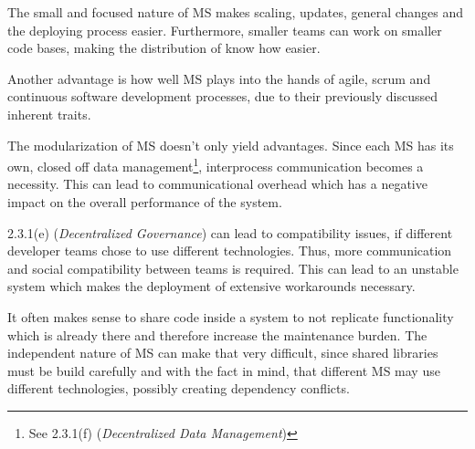 The small and focused nature of MS makes scaling, updates, general changes and the deploying process easier. Furthermore, smaller teams can work on smaller code bases, making the distribution of know how easier\cite{Riggins15}.

Another advantage is how well MS plays into the hands of agile, scrum and continuous software development processes, due to their previously discussed inherent traits.

The modularization of MS doesn't only yield advantages. Since each MS has its own, closed off data management\footnote{See 2.3.1(f) (\emph{Decentralized Data Management})}, interprocess communication becomes a necessity. This can lead to communicational overhead which has a negative impact on the overall performance of the system\cite{Wolff16}.

2.3.1(e) (\emph{Decentralized Governance}) can lead to compatibility issues, if different developer teams chose to use different technologies. Thus, more communication and social compatibility between teams is required. This can lead to an unstable system which makes the deployment of extensive workarounds necessary\cite{Riggins15}.

It often makes sense to share code inside a system to not replicate functionality which is already there and therefore increase the maintenance burden. The independent nature of MS can make that very difficult, since shared libraries must be build carefully and with the fact in mind, that different MS may use different technologies, possibly creating dependency conflicts.


